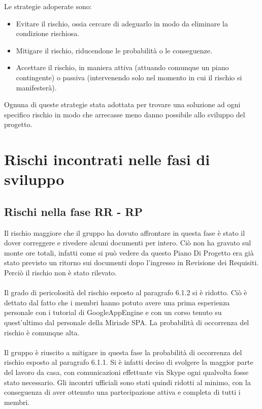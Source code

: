 Le strategie adoperate sono:
\begin{itemize}
	\item Evitare il rischio, ossia cercare di adeguarlo in modo da eliminare la
	condizione rischiosa. 
	\item Mitigare il rischio, riducendone le probabilit\`a o le conseguenze.
	\item Accettare il rischio, in maniera attiva (attuando comunque un piano
	contingente) o passiva (intervenendo solo nel momento in cui il rischio si
	manifester\`a).
\end{itemize}

Ognuna di queste strategie  stata adottata per trovare una soluzione
ad ogni specifico rischio in modo che arrecasse meno danno possibile allo
sviluppo del progetto.\\

\section{Rischi incontrati nelle fasi di sviluppo}

\subsection{Rischi nella fase RR - RP}
Il rischio maggiore che il gruppo ha dovuto affrontare in questa fase \`e stato il
dover correggere e rivedere alcuni documenti per intero. Ci\`o non ha gravato
sul monte ore totali, infatti come si pu\`o vedere da questo Piano Di Progetto era gi\`a
stato previsto un ritorno sui documenti dopo l'ingresso in Revisione dei
Requisiti. Perci\`o il rischio non \`e stato rilevato.\\
\\
Il grado di pericolosit\`a del rischio esposto al paragrafo 6.1.2 si \`e
ridotto. Ci\`o \`e dettato dal fatto che i membri hanno potuto avere una prima
esperienza personale con i tutorial di GoogleAppEngine e con un corso tenuto su quest'ultimo dal 
personale della Miriade SPA. La probabilit\`a di occorrenza del rischio \`e comunque alta.\\
\\
Il gruppo \`e riuscito a mitigare in questa fase la probabilit\`a di occorrenza del
rischio esposto al paragrafo 6.1.1. Si \`e
infatti deciso di svolgere la maggior parte del lavoro da casa, con comunicazioni effettuate via Skype ogni qualvolta fosse
stato necessario. Gli incontri ufficiali sono stati quindi ridotti al minimo,
con la conseguenza di aver ottenuto una partecipazione attiva e completa di
tutti i membri.\\
\\

